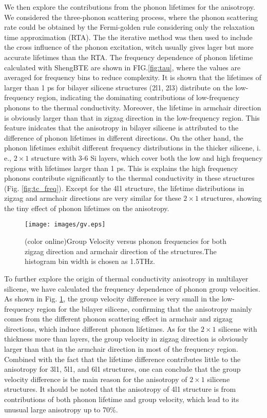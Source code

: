 \documentclass[aps,prb,twocolumn,showpacs,amsmath,amssymb]{revtex4-1}
\begin{document}
We then explore the contributions from the phonon lifetimes for the anisotropy.
We considered the three-phonon scattering process, where the phonon scattering rate could be obtained by the Fermi-golden rule\cite{Li2014} considering only the relaxation time approximation (RTA). The the iterative method was then used to include the cross influence of the phonon excitation, witch usually gives lager but more accurate lifetimes than the RTA. The frequency dependence of phonon lifetime calculated with ShengBTE\cite{Li2014} are shown in FIG.\ref{fig:tau}, where the values are averaged for frequency bins to reduce complexity.  It is shown that the lifetimes of larger than 1 ps for bilayer silicene structures (2l1, 2l3) distribute on the low-frequency region, indicating the dominating contributions of low-frequency phonons to the thermal conductivity. Moreover, the lifetime in armchair direction is obviously larger than that in zigzag direction in the low-frequency region. This feature inidcates that the anisotropy in bilayer silicene is attributed to the difference of phonon lifetimes in different directions.
On the other hand, the phonon lifetimes exhibit different frequency distributions in the thicker silicene, i. e.,  $2\times1$ structure with 3-6 Si layers, which cover both the low and high frequency regions with lifetimes  larger than 1 ps.  This is explains the high frequency phonons contribute significantly to the thermal conductivity in these structures (Fig. \ref{fig:tc_freq}).  Except for the 4l1 structure, the lifetime distributions in zigzag and armchair directions are very similar for these  $2\times1$ structures, showing the tiny effect of phonon lifetimes on the anisotropy.


\begin{figure}[b]
  \texttt{[image: images/gv.eps]}{}
  \caption{\label{fig:gv} (color online)Group Velocity versus phonon frequencies for both zigzag direction and armchair direction of the structures.The histogram bin width is chosen as 1.5THz.}
\end{figure}

To further explore the origin of thermal conductivity anisotropy in multilayer  silicene, we have calculated the frequency dependence of phonon group velocities. As shown in Fig. \ref{fig:gv},  the group velocity  difference is very small in the low-frequency region for the bilayer silicene, confirming that the anisotropy mainly comes from the different phonon scattering effect in armchair and zigzag directions,  which induce different phonon lifetimes.
As for the $2\times 1$ silicene with thickness more than layers,  the group velocity in zigzag direction is obviously larger than that in the armchair direction in most of the frequency region. Combined with the fact that the lifetime difference contributes little to the anisotropy for 3l1, 5l1, and 6l1 structures, one can conclude that the group velocity difference is the main reason for the anisotropy of $2\times 1$ silicene structures. It should be noted that the anisotropy of 4l1 structure is from contributions of both phonon lifetime and group velocity, which lead to its unusual large anisotropy up to 70\%.
\end{document}
